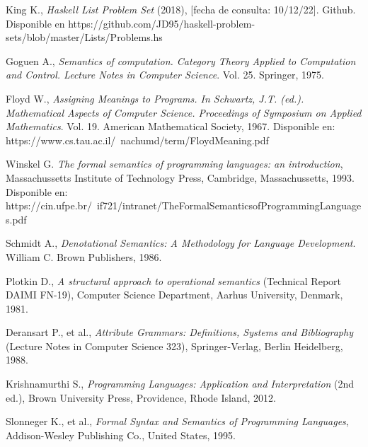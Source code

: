 \begin{thebibliography}{11}
    \bibitem{}
    \label{sec:19}
    \hypertarget{19}{}
    King K., \textit{Haskell List Problem Set} (2018), [fecha de consulta: 10/12/22]. Github. Disponible en https://github.com/JD95/haskell-problem-sets/blob/master/Lists/Problems.hs

    \bibitem{}
    \label{sec:20}
    \hypertarget{20}{}
    Goguen A., \textit{Semantics of computation. Category Theory Applied to Computation and Control. Lecture Notes in Computer Science}. Vol. 25. Springer, 1975.

    \bibitem{}
    \label{sec:21}
    \hypertarget{21}{}
    Floyd W., \textit{Assigning Meanings to Programs. In Schwartz, J.T. (ed.). Mathematical Aspects of Computer Science. Proceedings of Symposium on Applied Mathematics}. Vol. 19. American Mathematical Society, 1967. Disponible en: https://www.cs.tau.ac.il/~nachumd/term/FloydMeaning.pdf

    \bibitem{}
    \label{sec:22}
    \hypertarget{22}{}
    Winskel G.  \textit{The formal semantics of programming languages: an introduction}, Massachussetts Institute of Technology Press, Cambridge, Massachussetts, 1993. Disponible en: https://cin.ufpe.br/~if721/intranet/TheFormalSemanticsofProgrammingLanguages.pdf


    \bibitem{}
    \label{sec:23}
    \hypertarget{23}{}
    Schmidt A., \textit{Denotational Semantics: A Methodology for Language Development}. William C. Brown Publishers, 1986.

    \bibitem{}
    \label{sec:24}
    \hypertarget{24}{}
    Plotkin D., \textit{A structural approach to operational semantics} (Technical Report DAIMI FN-19), Computer Science Department, Aarhus University, Denmark, 1981.
    
    \bibitem{}
    \label{sec:25}
    \hypertarget{25}{}
    Deransart P., et al.,  \textit{Attribute Grammars: Definitions, Systems and Bibliography} (Lecture Notes in Computer Science 323), Springer-Verlag, Berlin Heidelberg, 1988.

    \bibitem{}
    \label{sec:26}
    \hypertarget{26}{}
    Krishnamurthi S., \textit{Programming Languages: Application and Interpretation} (2nd ed.), Brown University Press, Providence, Rhode Island, 2012.

    \bibitem{}
    \label{sec:27}
    \hypertarget{27}{}
    Slonneger K., et al., \textit{Formal Syntax and Semantics of Programming Languages}, Addison-Wesley Publishing Co., United States, 1995.


\end{thebibliography}
